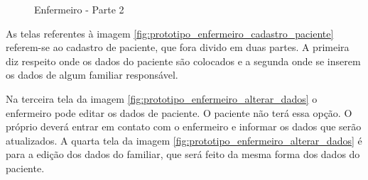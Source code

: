 \begin{figure}[H]
    \centering
\end{figure}

\begin{figure}[H]
    \centering   
    \caption{Enfermeiro - Parte 2}
\end{figure}


As telas referentes à imagem \ref{fig:prototipo_enfermeiro_cadastro_paciente} referem-se ao cadastro de paciente, que fora divido em duas partes. A primeira diz respeito onde os dados do paciente são colocados e a segunda onde se inserem os dados de algum familiar responsável.

Na terceira tela da imagem \ref{fig:prototipo_enfermeiro_alterar_dados} o enfermeiro pode editar os dados de paciente. O paciente não terá essa opção. O próprio deverá entrar em contato com o enfermeiro e informar os dados que serão atualizados. A quarta tela da imagem \ref{fig:prototipo_enfermeiro_alterar_dados} é para a edição dos dados do familiar, que será feito da mesma forma dos dados do paciente.

